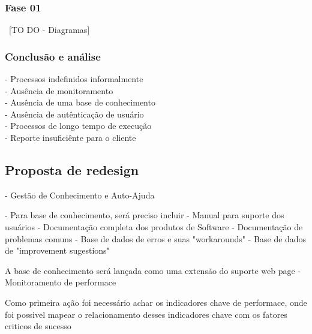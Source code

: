 \documentclass[11pt,a4paper]{article}
\begin{document}
\subsubsection{Fase 01}
~[TO DO - Diagramas]

\subsubsection{Conclusão e análise}
- Processos indefinidos informalmente\\
- Ausência de monitoramento\\
- Ausência de uma base de conhecimento\\
- Ausência de autênticação de usuário\\
- Processos de longo tempo de execução\\
- Reporte insuficiênte para o cliente\\

\subsection{Proposta de redesign}
- Gestão de Conhecimento e Auto-Ajuda

- Para base de conhecimento, será preciso incluir
	- Manual para suporte dos usuários
	- Documentação completa dos produtos de Software
	- Documentação de problemas comuns
	- Base de dados de erros e suas "workarounds"
	- Base de dados de "improvement sugestions"

A base de conhecimento será lançada como uma extensão do
suporte web page
- Monitoramento de performace

Como primeira ação foi necessário achar os indicadores chave de performace,
onde foi possivel mapear o relacionamento desses indicadores chave com os fatores
criticos de sucesso
\end{document}

